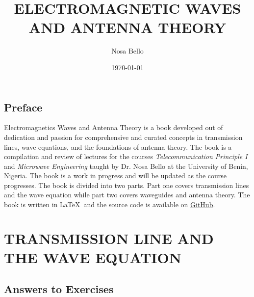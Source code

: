 \documentclass[a4paper,10pt, twocolumn]{book}
\begin{document}
\author{Nosa Bello}
\title{\color{blue}ELECTROMAGNETIC WAVES AND ANTENNA THEORY}
\date{\today}

\frontmatter
\maketitle
\tableofcontents

\chapter{Preface}
Electromagnetics Waves and Antenna Theory is a book developed out of dedication and passion for comprehensive and curated concepts in transmission lines, wave equations, and the foundations of antenna theory. The book is a compilation and review of lectures for the courses \textit{Telecommunication Principle I} and \textit{Microwave Engineering} taught by Dr. Nosa Bello at the University of Benin, Nigeria. The book is a work in progress and will be updated as the course progresses. The book is divided into two parts. Part one covers transmission lines and the wave equation while part two covers waveguides and antenna theory. The book is written in \LaTeX\ and the source code is available on \href{https://github.com/allisonoge/electromagnetism-and-antenna-theory-v2.git}{GitHub}.

\mainmatter

\part{TRANSMISSION LINE AND THE WAVE EQUATION}


% 
% 
% 
% 
% 
% 
% 
% 
% 
% 
% 
% 
% 
% 



% 

% 
% 
% 
% 
% 
% 
% 
% 
% 
% 
% 
% 
% 
% 
% 
% 
% 

\backmatter
\printindex

\appendix

\chapter*{Answers to Exercises}
\shipoutAnswer
\end{document}
